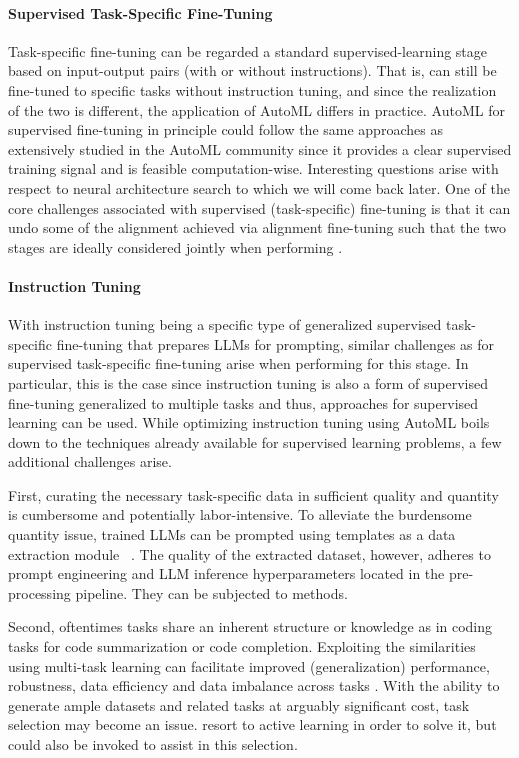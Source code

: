 \paragraph{Supervised Task-Specific Fine-Tuning} Task-specific fine-tuning can be regarded a standard supervised-learning stage based on input-output pairs (with or without instructions). That is,
\LLMs can still be fine-tuned to specific tasks without instruction tuning, and since the realization of the two is different, the application of AutoML differs in practice. AutoML for supervised fine-tuning in principle could follow the same approaches as extensively studied in the AutoML community since it provides a clear supervised training signal and is feasible computation-wise. Interesting questions arise with respect to neural architecture search to which we will come back later. One of the core challenges associated with supervised (task-specific) fine-tuning is that it can undo some of the alignment achieved via alignment fine-tuning \cite{qi-arxiv23a} such that the two stages are ideally considered jointly when performing \HPO.

\paragraph{Instruction Tuning}

With instruction tuning being a specific type of generalized supervised task-specific fine-tuning \cite{wei-iclr22a} that prepares LLMs for prompting, similar challenges as for supervised task-specific fine-tuning arise when performing \AutoML for this stage.
In particular, this is the case since instruction tuning is also a form of supervised fine-tuning generalized to multiple tasks and thus, \AutoML approaches for supervised learning can be used.
While optimizing instruction tuning using AutoML boils down to the techniques already available for supervised learning problems, a few additional challenges arise.

First, curating the necessary task-specific data in sufficient quality and quantity is cumbersome and potentially labor-intensive.
To alleviate the burdensome quantity issue, trained LLMs can be prompted using templates as a data extraction module ~\cite{zhang-arxiv23c}.
The quality of the extracted dataset, however, adheres to prompt engineering and LLM inference hyperparameters located in the pre-processing pipeline.
They can be subjected to \AutoML methods.

Second, oftentimes tasks share an inherent structure or knowledge as in coding tasks for code summarization or code completion.
Exploiting the similarities using multi-task learning can facilitate improved (generalization) performance, robustness, data efficiency and data imbalance across tasks \cite{liu-arxiv23a}.
With the ability to generate ample datasets and related tasks at arguably significant cost, task selection may become an issue.
\cite{kung-emnlp23a} resort to active learning in order to solve it, but \AutoML could also be invoked to assist in this selection. 


